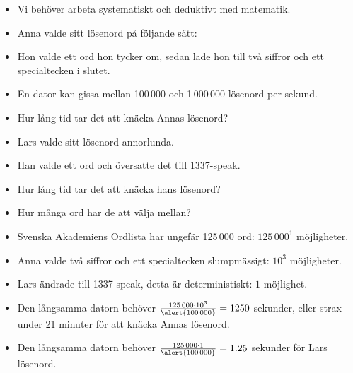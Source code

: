 \begin{frame}
  \begin{solution}
    \begin{itemize}
      \item Vi behöver arbeta systematiskt och deduktivt med matematik.
    \end{itemize}
  \end{solution}
\end{frame}

\begin{frame}
  \begin{exercise}
    \begin{itemize}
      \item Anna valde sitt lösenord på följande sätt:
      \item Hon valde ett ord hon tycker om, sedan lade hon till två siffror 
        och ett specialtecken i slutet.
      \item En dator kan gissa mellan 100\,000 och 1\,000\,000 lösenord per 
        sekund.
      \item Hur lång tid tar det att knäcka Annas lösenord?
    \end{itemize}
  \end{exercise}

  \pause

  \begin{exercise}
    \begin{itemize}
      \item Lars valde sitt lösenord annorlunda.
      \item Han valde ett ord och översatte det till 1337-speak.
      \item Hur lång tid tar det att knäcka hans lösenord?
    \end{itemize}
  \end{exercise}
\end{frame}

\begin{frame}
  \begin{solution}
    \begin{itemize}
      \item<+-> Hur många ord har de att välja mellan?
      \item<+-> Svenska Akademiens Ordlista har ungefär 125\,000 ord: 
        \(125\,000^1\) möjligheter.
      \item<+-> Anna valde två siffror och ett specialtecken slumpmässigt: 
        \(10^3\) möjligheter.
      \item<+-> Lars ändrade till 1337-speak, detta är deterministiskt: \(1\) 
        möjlighet.
      \item<+-> Den \alert{långsamma} datorn behöver \(\frac{125\,000\cdot 
        10^3}{\alert{100\,000}} = 1250\) sekunder, eller strax under 21 minuter 
        för att knäcka Annas lösenord.
      \item<+-> Den \alert{långsamma} datorn behöver \(\frac{125\,000\cdot 
        1}{\alert{100\,000}} = 
        1.25\) sekunder för Lars lösenord.
    \end{itemize}
  \end{solution}
\end{frame}

